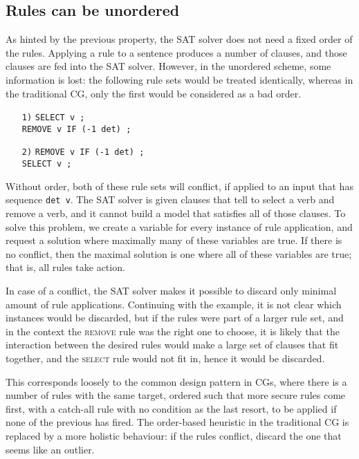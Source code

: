 \subsection{Rules can be unordered}
\label{sec:unord}

As hinted by the previous property, the SAT solver does not need a fixed
order of the rules.
Applying a rule to a sentence produces a number of clauses,
and those clauses are fed into the SAT solver.
However, in the unordered scheme, some information is lost: the
following rule sets would be treated identically, whereas in the
traditional CG, only the first would be considered as a bad order.

\begin{itemize}
\item [\texttt{1)}] \texttt{SELECT v ;} \\
         \texttt{REMOVE v IF (-1 det) ;} 
\item [\texttt{2)}] \texttt{REMOVE v IF (-1 det) ;} \\
         \texttt{SELECT v ;}
\end{itemize}

Without order, both of these rule sets will conflict, if applied to an
input that has sequence \texttt{det v}.
The SAT solver is given clauses that tell to select a verb and remove a
verb, and it cannot build a model that satisfies all of those clauses.
To solve this problem, we create a variable for every instance of rule application, and request a solution where maximally many of these variables are true.
If there is no conflict, then the maximal solution is one where all of
these variables are true; that is, all rules take action.


In case of a conflict, the SAT solver makes it possible to discard only
minimal amount of rule applications. Continuing with the example,
it is not clear which instances would be discarded, but if the rules
were part of a larger rule set, and in the context the \textsc{remove} rule was
the right one to choose, it is likely that the interaction between the desired
rules would make a large set of clauses that fit together, and the
\textsc{select} rule would not fit in, hence it would be discarded. 

This corresponds loosely to the common design pattern in
CGs, where there is a number of rules with the same target, ordered
such that more secure rules come first,
with a catch-all rule with no condition as the last resort, to be
applied if none of the previous has fired.
The order-based heuristic in the traditional CG is replaced by a more
holistic behaviour: if the rules conflict, discard the one that seems
like an outlier.


